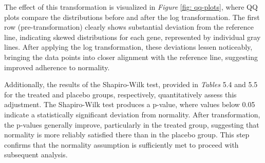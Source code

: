 \documentclass{report}
\begin{document}
	The effect of this transformation is visualized in \textit{Figure} \ref{fig: qq-plots}, where QQ plots compare the distributions before and after the log transformation. The first row (pre-transformation) clearly shows substantial deviation from the reference line, indicating skewed distributions for each gene, represented by individual gray lines. After applying the log transformation, these deviations lessen noticeably, bringing the data points into closer alignment with the reference line, suggesting improved adherence to normality.
	
	Additionally, the results of the Shapiro-Wilk test, provided in \textit{Tables} 5.4 and 5.5 for the treated and placebo groups, respectively, quantitatively assess this adjustment. The Shapiro-Wilk test produces a p-value, where values below 0.05 indicate a statistically significant deviation from normality. After transformation, the p-values generally improve, particularly in the treated group, suggesting that normality is more reliably satisfied there than in the placebo group.
	This step confirms that the normality assumption is sufficiently met to proceed with subsequent analysis.
	
\end{document}
